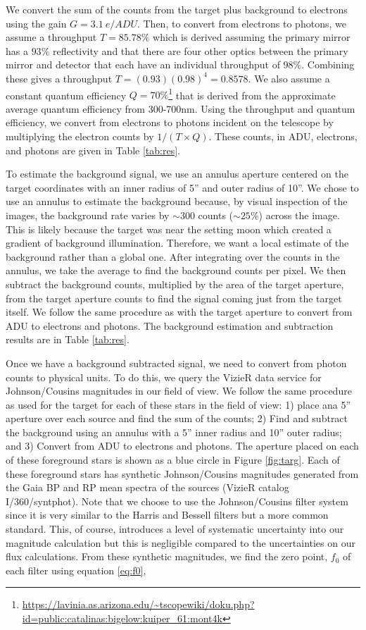 \documentclass{aastex631}
\begin{document}
We convert the sum of the counts from the target plus background to electrons using the gain $G=3.1~e/ADU$. Then, to convert from electrons to photons, we assume a throughput $T=85.78\%$ which is derived assuming the primary mirror has a $93\%$ reflectivity and that there are four other optics between the primary mirror and detector that each have an individual throughput of $98\%$. Combining these gives a throughput $T=(0.93)(0.98)^4=0.8578$. We also assume a constant quantum efficiency $Q=70\%$\footnote{\url{https://lavinia.as.arizona.edu/~tscopewiki/doku.php?id=public:catalinas:bigelow:kuiper_61:mont4k}} that is derived from the approximate average quantum efficiency from 300-700nm. Using the throughput and quantum efficiency, we convert from electrons to photons incident on the telescope by multiplying the electron counts by $1/(T \times Q)$. These counts, in ADU, electrons, and photons are given in Table \ref{tab:res}.

To estimate the background signal, we use an annulus aperture centered on the target coordinates with an inner radius of 5'' and outer radius of 10''. We chose to use an annulus to estimate the background because, by visual inspection of the images, the background rate varies by $\sim300$ counts ($\sim25\%$) across the image. This is likely because the target was near the setting moon which created a gradient of background illumination. Therefore, we want a local estimate of the background rather than a global one. After integrating over the counts in the annulus, we take the average to find the background counts per pixel. We then subtract the background counts, multiplied by the area of the target aperture, from the target aperture counts to find the signal coming just from the target itself. We follow the same procedure as with the target aperture to convert from ADU to electrons and photons. The background estimation and subtraction results are in Table \ref{tab:res}.

Once we have a background subtracted signal, we need to convert from photon counts to physical units. To do this, we query the VizieR data service for Johnson/Cousins magnitudes in our field of view. We follow the same procedure as used for the target for each of these stars in the field of view: 1) place ana 5'' aperture  over each source and find the sum of the counts; 2) Find and subtract the background using an annulus with a 5'' inner radius and 10'' outer radius; and 3) Convert from ADU to electrons and photons. The aperture placed on each of these foreground stars is shown as a blue circle in Figure \ref{fig:targ}. Each of these foreground stars has synthetic Johnson/Cousins magnitudes generated from the Gaia BP and RP mean spectra of the sources \citep{gaiadr3,gaiadr3_syntphot} (VizieR catalog I/360/syntphot). Note that we choose to use the Johnson/Cousins filter system since it is very similar to the Harris and Bessell filters but a more common standard. This, of course, introduces a level of systematic uncertainty into our magnitude calculation but this is negligible compared to the  uncertainties on our flux calculations. From these synthetic magnitudes, we find the zero point, $f_0$ of each filter using equation \ref{eq:f0},
\end{document}
